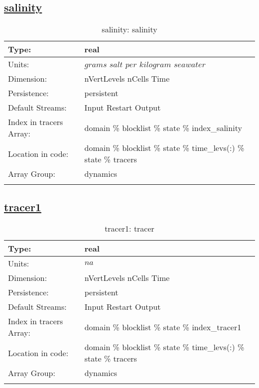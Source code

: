 \subsection[salinity]{\hyperref[sec:var_tab_state]{salinity}}
\label{subsec:var_sec_state_salinity}
\begin{center}
\begin{longtable}{| p{2.0in} | p{4.0in} |}
        \hline 
        Type: & real \\
        \hline 
        Units: & $grams$ $salt$ $per$ $kilogram$ $seawater$ \\
        \hline 
        Dimension: & nVertLevels nCells Time \\
        \hline 
        Persistence: & persistent \\
        \hline 
		 Default Streams: & Input Restart Output  \\
        \hline 
		 Index in tracers Array: & domain \% blocklist \% state \% index\_salinity \\
		 \hline 
		 Location in code: & domain \% blocklist \% state \% time\_levs(:) \% state \% tracers \\
		 \hline 
		 Array Group: & dynamics \\
		 \hline 
    \caption{salinity: salinity}
\end{longtable}
\end{center}
\subsection[tracer1]{\hyperref[sec:var_tab_state]{tracer1}}
\label{subsec:var_sec_state_tracer1}
\begin{center}
\begin{longtable}{| p{2.0in} | p{4.0in} |}
        \hline 
        Type: & real \\
        \hline 
        Units: & $na$ \\
        \hline 
        Dimension: & nVertLevels nCells Time \\
        \hline 
        Persistence: & persistent \\
        \hline 
		 Default Streams: & Input Restart Output  \\
        \hline 
		 Index in tracers Array: & domain \% blocklist \% state \% index\_tracer1 \\
		 \hline 
		 Location in code: & domain \% blocklist \% state \% time\_levs(:) \% state \% tracers \\
		 \hline 
		 Array Group: & dynamics \\
		 \hline 
    \caption{tracer1: tracer}
\end{longtable}
\end{center}
